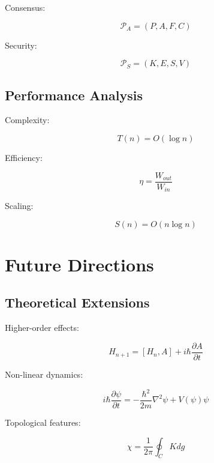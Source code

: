 \documentclass[12pt]{article}
\begin{document}
Consensus:

\begin{equation}
\mathcal{P}_A = (P,A,F,C)
\end{equation}

Security:

\begin{equation}
\mathcal{P}_S = (K,E,S,V)
\end{equation}

\subsection{Performance Analysis}

Complexity:

\begin{equation}
T(n) = O(\log n)
\end{equation}

Efficiency:

\begin{equation}
\eta = \frac{W_{out}}{W_{in}}
\end{equation}

Scaling:

\begin{equation}
S(n) = O(n\log n)
\end{equation}

\section{Future Directions}

\subsection{Theoretical Extensions}

Higher-order effects:

\begin{equation}
H_{n+1} = [H_n,A] + i\hbar\frac{\partial A}{\partial t}
\end{equation}

Non-linear dynamics:

\begin{equation}
i\hbar\frac{\partial\psi}{\partial t} = -\frac{\hbar^2}{2m}\nabla^2\psi + V(\psi)\psi
\end{equation}

Topological features:

\begin{equation}
\chi = \frac{1}{2\pi}\oint_C K dg
\end{equation}
\end{document}
